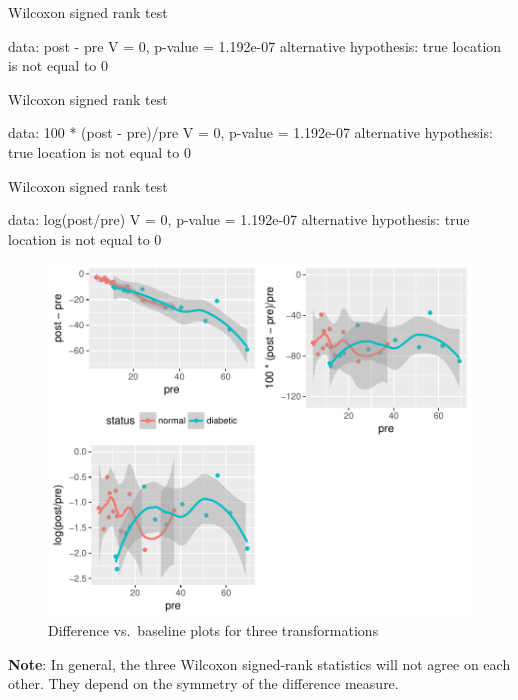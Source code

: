 \begin{Schunk}
\begin{Soutput}
	Wilcoxon signed rank test

data:  post - pre
V = 0, p-value = 1.192e-07
alternative hypothesis: true location is not equal to 0


	Wilcoxon signed rank test

data:  100 * (post - pre)/pre
V = 0, p-value = 1.192e-07
alternative hypothesis: true location is not equal to 0


	Wilcoxon signed rank test

data:  log(post/pre)
V = 0, p-value = 1.192e-07
alternative hypothesis: true location is not equal to 0
\end{Soutput}
\begin{figure}[htbp]

\centerline{\includegraphics{change-analysis-1} }

\caption[Difference vs]{Difference vs.\ baseline plots for three transformations}\label{fig:change-analysis}
\end{figure}
\end{Schunk}
\textbf{Note}: In general, the three Wilcoxon signed-rank statistics
will not agree on each other.  They depend on the symmetry of the
difference measure.
\nocite{kai89,tor85how,mar85mod,kro93spu,col00sym}

